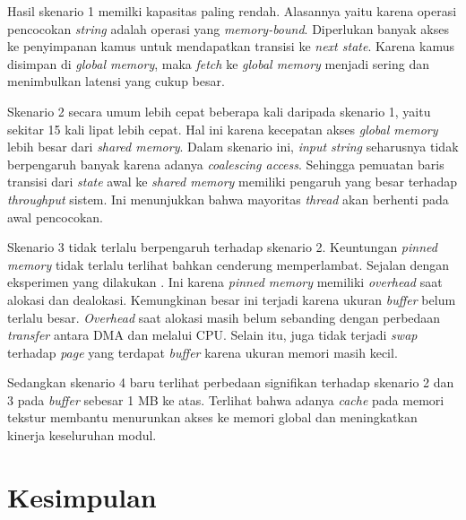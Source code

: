 \documentclass[conference]{IEEEtran}
\begin{document}
         

        Hasil skenario 1 memilki kapasitas paling rendah. Alasannya yaitu karena operasi pencocokan \emph{string} adalah operasi yang \emph{memory-bound}. Diperlukan banyak akses ke penyimpanan kamus untuk mendapatkan transisi ke \emph{next state}. Karena kamus disimpan di \emph{global memory}, maka \emph{fetch} ke \emph{global memory} menjadi sering dan menimbulkan latensi yang cukup besar.
        
        Skenario 2 secara umum lebih cepat beberapa kali daripada skenario 1, yaitu sekitar 15 kali lipat lebih cepat. Hal ini karena kecepatan akses \emph{global memory} lebih besar dari \emph{shared memory}. Dalam skenario ini, \emph{input string} seharusnya tidak berpengaruh banyak karena adanya \emph{coalescing access}. Sehingga pemuatan baris transisi dari \emph{state} awal ke \emph{shared memory} memiliki pengaruh yang besar terhadap \emph{throughput} sistem. Ini menunjukkan bahwa mayoritas \emph{thread} akan berhenti pada awal pencocokan.
        
        Skenario 3 tidak terlalu berpengaruh terhadap skenario 2. Keuntungan \emph{pinned memory} tidak terlalu terlihat bahkan cenderung memperlambat. Sejalan dengan eksperimen yang dilakukan \cite{gnort2008}. Ini karena \emph{pinned memory} memiliki \emph{overhead} saat alokasi dan dealokasi. Kemungkinan besar ini terjadi karena ukuran \emph{buffer} belum terlalu besar. \emph{Overhead} saat alokasi masih belum sebanding dengan perbedaan \emph{transfer} antara DMA dan melalui CPU. Selain itu, juga tidak terjadi \emph{swap} terhadap \emph{page} yang terdapat \emph{buffer} karena ukuran memori masih kecil.
        
        Sedangkan skenario 4 baru terlihat perbedaan signifikan terhadap skenario 2 dan 3 pada \emph{buffer} sebesar 1 MB ke atas. Terlihat bahwa adanya \emph{cache} pada memori tekstur membantu menurunkan akses ke memori global dan meningkatkan kinerja keseluruhan modul. 

\section{Kesimpulan}
 
\end{document}
